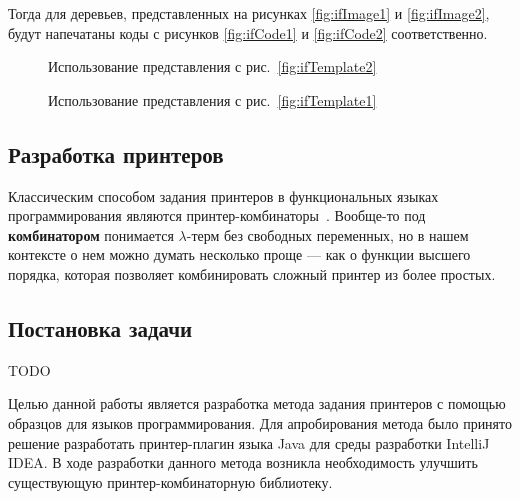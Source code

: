 Тогда для деревьев, представленных на рисунках
\ref{fig:ifImage1} и \ref{fig:ifImage2}, будут напечатаны коды с
рисунков \ref{fig:ifCode1} и \ref{fig:ifCode2} соответственно.

\begin{figure}[h!]
	\subfloat[]{
		\centering
		\texttt{[image: if1]}
		\label{fig:ifImage1}
	}
	\quad
	\subfloat[]{
		\centering
		
		\label{fig:ifCode1}	
	}

	\caption{Использование представления с рис.~\ref{fig:ifTemplate2}}
\end{figure}

\begin{figure}[h!]
	\subfloat[]{
		\centering
		\texttt{[image: if2]}
		\label{fig:ifImage2}
	}
	\quad
	\subfloat[]{
		\centering
		
		\label{fig:ifCode2}	
	}

	\caption{Использование представления с рис.~\ref{fig:ifTemplate1}}
\end{figure}

\subsection{Разработка принтеров}

Классическим способом задания принтеров в функциональных языках
программирования являются
принтер-комбинаторы~\cite{wadler, swierstra, swierstraChitil,
swierstra04, hughes, peytonJones, kiselyov, chitil, swiComb}.
Вообще-то под \textbf{комбинатором} понимается
$\lambda$-терм без свободных переменных, но в нашем контексте о нем можно
думать несколько проще --- как о функции высшего порядка,
которая позволяет комбинировать сложный принтер из более простых.

\subsection{Постановка задачи}

TODO

Целью данной работы является разработка метода задания принтеров с помощью
образцов для языков программирования. 
Для апробирования метода было принято решение разработать принтер-плагин
языка Java для среды разработки IntelliJ IDEA.
В ходе разработки данного метода возникла необходимость улучшить существующую
принтер-комбинаторную библиотеку\cite{swierstra}. 
